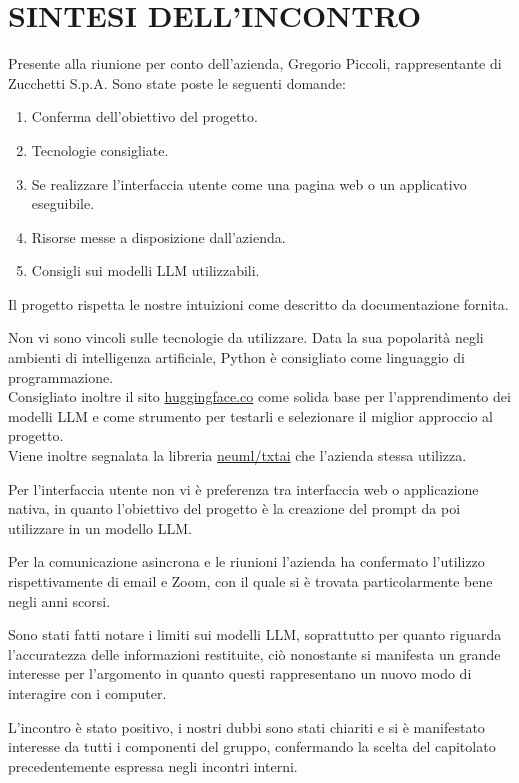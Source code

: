 \documentclass[5pt]{article}
\begin{document}
\section{SINTESI DELL'INCONTRO}
Presente alla riunione per conto dell’azienda, Gregorio Piccoli, rappresentante di Zucchetti
S.p.A.
Sono state poste le seguenti domande:\\
\begin{enumerate}
    \item Conferma dell'obiettivo del progetto.
    \item Tecnologie consigliate.
    \item Se realizzare l’interfaccia utente come una pagina web o un applicativo eseguibile.
    \item Risorse messe a disposizione dall’azienda.
    \item Consigli sui modelli LLM utilizzabili.
\end{enumerate}

\vspace{10pt}
Il progetto rispetta le nostre intuizioni come descritto da documentazione fornita.

\vspace{10pt}
\noindent Non vi sono vincoli sulle tecnologie da utilizzare. Data la sua popolarità negli ambienti di
intelligenza artificiale, Python è consigliato come linguaggio di programmazione.\\
Consigliato inoltre il sito \href{https://huggingface.co}{huggingface.co} come solida base per l’apprendimento dei modelli LLM
e come strumento per testarli e selezionare il miglior approccio al progetto.\\
Viene inoltre
segnalata la libreria \href{https://github.com/neuml/txtai}{neuml/txtai} che l’azienda stessa utilizza.

\vspace{10pt}
\noindent Per l’interfaccia utente non vi è preferenza tra interfaccia web o applicazione nativa, in quanto
l’obiettivo del progetto è la creazione del prompt da poi utilizzare in un modello LLM.

\vspace{10pt}
\noindent Per la comunicazione asincrona e le riunioni l’azienda ha confermato l’utilizzo rispettivamente di
email e Zoom, con il quale si è trovata particolarmente bene negli anni scorsi.

\vspace{10pt}
\noindent Sono stati fatti notare i limiti sui modelli LLM, soprattutto per quanto riguarda l’accuratezza delle
informazioni restituite, ciò nonostante si manifesta un grande interesse per l’argomento in
quanto questi rappresentano un nuovo modo di interagire con i computer.

\vspace{10pt}
\noindent L’incontro è stato positivo, i nostri dubbi sono stati chiariti e si è manifestato interesse da tutti i
componenti del gruppo, confermando la scelta del capitolato precedentemente espressa negli
incontri interni.
\end{document}
